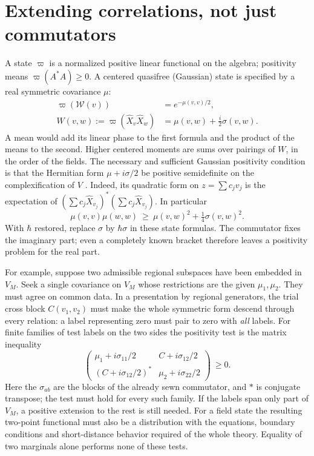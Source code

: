 \section{Extending correlations, not just commutators}
A state $\varpi$ is a normalized positive linear functional on the algebra;
positivity means $\varpi(A^*A)\ge0$. A centered quasifree (Gaussian)
state is specified by a real symmetric covariance $\mu$:
\begin{align}
 \varpi(\mathcal W(v))&=e^{-\mu(v,v)/2},\nonumber\\
 W(v,w):=\varpi(\widehat X_v\widehat X_w)
 &=\mu(v,w)+\tfrac i2\sigma(v,w) .\label{eq:11-covariance}
\end{align}
A mean would add its linear phase to the first formula and the product of
the means to the second. Higher centered moments are sums over pairings of
$W$, in the order of the fields. The necessary and sufficient Gaussian
positivity condition is that the Hermitian form $\mu+i\sigma/2$ be positive
semidefinite on the complexification of $V$ \cite{WaldQFT,Haag}. Indeed,
its quadratic form on $z=\sum c_j v_j$ is the expectation of
$(\sum c_j\widehat X_{v_j})^*(\sum c_j\widehat X_{v_j})$. In particular
\[
 \mu(v,v)\mu(w,w)\ \ge\ \mu(v,w)^2+\tfrac14\sigma(v,w)^2 .
\]
With $\hbar$ restored, replace $\sigma$ by $\hbar\sigma$ in these state
formulas. The commutator fixes the imaginary part; even a completely known
bracket therefore leaves a positivity problem for the real part.

For example, suppose two admissible regional subspaces have been embedded
in $V_M$. Seek a single covariance on $V_M$ whose restrictions are the
given $\mu_1,\mu_2$. They must agree on common data. In a presentation by
regional generators, the trial cross block $C(v_1,v_2)$ must make the
whole symmetric form descend through every relation: a label representing
zero must pair to zero with \emph{all} labels. For finite families of test
labels on the two sides the positivity test is the matrix inequality
\[
 \begin{pmatrix}
   \mu_1+i\sigma_{11}/2 & C+i\sigma_{12}/2\\
   (C+i\sigma_{12}/2)^* & \mu_2+i\sigma_{22}/2
 \end{pmatrix}\ \ge 0 .
\]
Here the $\sigma_{ab}$ are the blocks of the already sewn commutator, and
$*$ is conjugate transpose; the test must hold for every such family. If
the labels span only part of $V_M$, a positive extension to the rest is
still needed. For a field state the resulting two-point functional must
also be a distribution with the equations, boundary conditions and
short-distance behavior required of the whole theory. Equality of two
marginals alone performs none of these tests.

